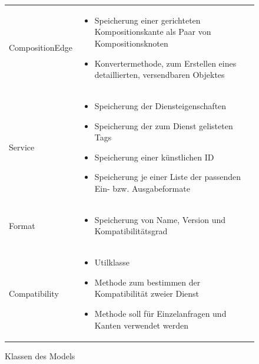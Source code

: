 \begin{figure}[h]
\begin{tabularx}{\textwidth}{p{} | X}
		\rowcolor[HTML]{E7E7E7}
		CompositionEdge & \compress \begin{itemize}
			\item Speicherung einer gerichteten Kompositionskante als Paar von Kompositionsknoten
			\item Konvertermethode, zum Erstellen eines detaillierten, versendbaren Objektes
		\end{itemize} \\
		Service & \compress \begin{itemize}
			\item Speicherung der Diensteigenschaften
			\item Speicherung der zum Dienst gelisteten Tags
			\item Speicherung einer künstlichen ID
			\item Speicherung je einer Liste der passenden Ein- bzw. Ausgabeformate
		\end{itemize} \\
		\rowcolor[HTML]{E7E7E7}
		Format & \compress \begin{itemize}
			\item Speicherung von Name, Version und Kompatibilitätsgrad
		\end{itemize} \\
		Compatibility & \compress \begin{itemize}
			\item Utilklasse
			\item Methode zum bestimmen der Kompatibilität zweier Dienst
			\item Methode soll für Einzelanfragen und Kanten verwendet werden
		\end{itemize} \\
	\end{tabularx}
	\caption{Klassen des Models}
	\label{table:klassenbeschreibung-a}
\end{figure}

